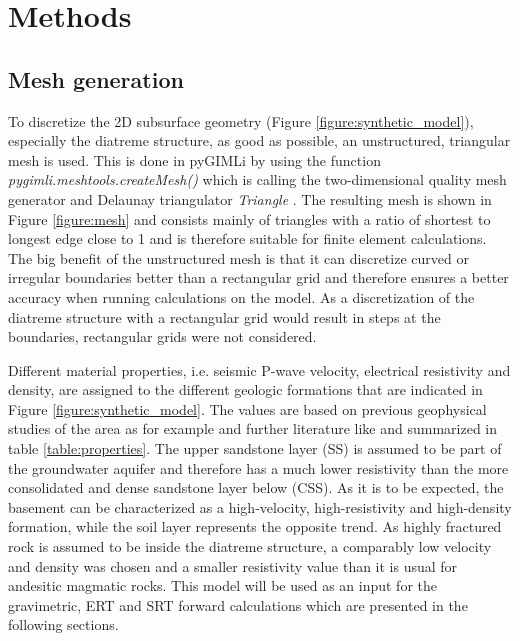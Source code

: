 \section{Methods}\label{section:Methods}

\subsection{Mesh generation}\label{section:Mesh}
To discretize the 2D subsurface geometry (Figure \ref{figure:synthetic_model}), especially the diatreme structure, as good as possible, an unstructured, triangular mesh is used. This is done in pyGIMLi by using the function \textit{pygimli.meshtools.createMesh()} which is calling the two-dimensional quality mesh generator and Delaunay triangulator \textit{Triangle} \citep{shewchuk1996triangle}. The resulting mesh is shown in Figure \ref{figure:mesh} and consists mainly of triangles with a ratio of shortest to longest edge close to 1 and is therefore suitable for finite element calculations. The big benefit of the unstructured mesh is that it can discretize curved or irregular boundaries better than a rectangular grid and therefore ensures a better accuracy when running calculations on the model. As a discretization of the diatreme structure with a rectangular grid would result in steps at the boundaries, rectangular grids were not considered.

Different material properties, i.e. seismic P-wave velocity, electrical resistivity and density, are assigned to the  different geologic formations that are indicated in Figure \ref{figure:synthetic_model}. The values are based on previous geophysical studies of the area as for example \citet{NiklasPlumpe.2015,TimGilberti.2020} and further literature like \citet{geldart2004problems,palacky1988resistivity} and summarized in table \ref{table:properties}. The upper sandstone layer (SS) is assumed to be part of the groundwater aquifer and therefore has a much lower resistivity than the more consolidated and dense sandstone layer below (CSS). As it is to be expected, the basement can be characterized as a high-velocity, high-resistivity and high-density formation, while the soil layer represents the opposite trend. As highly fractured rock is assumed to be inside the diatreme structure, a comparably low velocity and density was chosen and a smaller resistivity value than it is usual for andesitic magmatic rocks. This model will be used as an input for the gravimetric, ERT and SRT forward calculations which are presented in the following sections.

